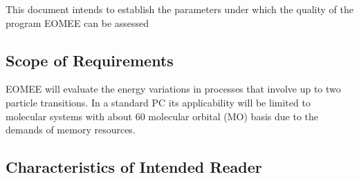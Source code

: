 \documentclass[12pt]{article}
\begin{document}
	This document intends to establish the parameters under which the quality 
	of the program EOMEE can be assessed %

\subsection{Scope of Requirements} 

%

EOMEE will evaluate the energy variations in processes that involve up to two 
particle transitions. In a standard PC its applicability will be limited to 
molecular systems with about 60 molecular orbital (MO) basis due to the demands 
of memory resources.

\subsection{Characteristics of Intended Reader} \label{sec_IntendedReader}

%
\end{document}
